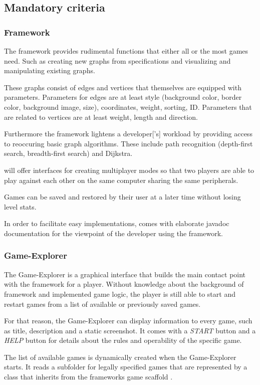 \subsection{Mandatory criteria}
\subsubsection{Framework}
The framework provides rudimental functions that either all or the most games need. Such as creating new graphs from specifications and visualizing and manipulating existing graphs.\par
These graphs consist of \glspl{edge} and \glspl{vertice} that themselves are equipped with parameters. Parameters for edges are at least style (background color, border color, background image, size), coordinates, weight, sorting, \gls{ID}. Parameters that are related to vertices are at least weight, length and direction.\par
Furthermore the framework lightens a \gls{developer}['s] workload by providing access to reoccuring basic graph algorithms. These include path recognition (depth-first search, breadth-first search) and Dijkstra.\par {}
\graphioli will offer interfaces for creating multiplayer modes so that two \glspl{player} are able to play against each other on the same computer sharing the same peripherals.\par
Games can be saved and restored by their user at a later time without losing \gls{level} stats.\par
In order to facilitate easy implementations, \graphioli comes with elaborate \Gls{javadoc} documentation for the viewpoint of the developer using the framework.\par {}

\subsubsection{Game-Explorer}
The Game-Explorer is a graphical interface that builds the main contact point with the framework for a player. Without knowledge about the background of framework and implemented game logic, the player is still able to start and restart games from a list of available or previously saved games.\par
For that reason, the Game-Explorer can display information to every game, such as title, description and a static screenshot. It comes with a \emph{START} button  and a \emph{HELP} button for details about the rules and operability of the specific game.\par
The list of available games is dynamically created when the Game-Explorer starts. It reads a subfolder for legally specified games that are represented by a class that inherits from the frameworks game scaffold .

